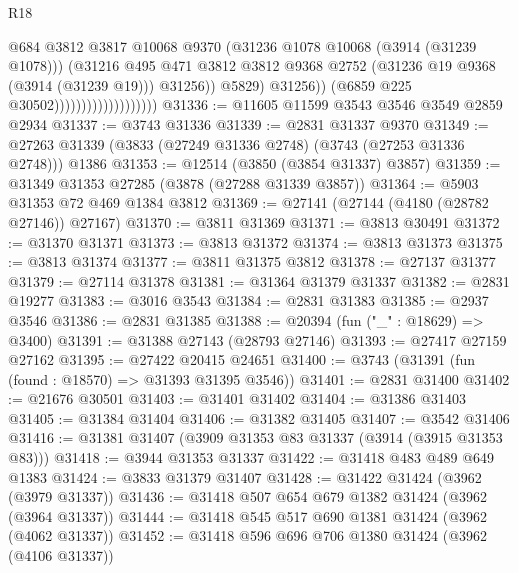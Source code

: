 \begin{lexlean}{R18}
\begin{coremodule}
                                                @684
                                                @3812
                                                @3817
                                                @10068
                                                @9370
                                                (@31236 @1078 @10068 (@3914 (@31239 @1078)))
                                                (@31216
                                                  @495
                                                  @471
                                                  @3812
                                                  @3812
                                                  @9368
                                                  @2752
                                                  (@31236 @19 @9368 (@3914 (@31239 @19)))
                                                  @31256))
                                              @5829)
                                            @31256))
                                        (@6859 @225 @30502)))))))))))))))))))
@31336 := @11605 @11599 @3543 @3546 @3549 @2859 @2934
@31337 := @3743 @31336
@31339 := @2831 @31337 @9370
@31349 := @27263 @31339 (@3833 (@27249 @31336 @2748) (@3743 (@27253 @31336 @2748))) @1386
@31353 := @12514 (@3850 (@3854 @31337) @3857)
@31359 := @31349 @31353 @27285 (@3878 (@27288 @31339 @3857))
@31364 := @5903 @31353 @72 @469 @1384 @3812
@31369 := @27141 (@27144 (@4180 (@28782 @27146)) @27167)
@31370 := @3811 @31369
@31371 := @3813 @30491
@31372 := @31370 @31371
@31373 := @3813 @31372
@31374 := @3813 @31373
@31375 := @3813 @31374
@31377 := @3811 @31375 @3812
@31378 := @27137 @31377
@31379 := @27114 @31378
@31381 := @31364 @31379 @31337
@31382 := @2831 @19277
@31383 := @3016 @3543
@31384 := @2831 @31383
@31385 := @2937 @3546
@31386 := @2831 @31385
@31388 := @20394 (fun ("_" : @18629) => @3400)
@31391 := @31388 @27143 (@28793 @27146)
@31393 := @27417 @27159 @27162
@31395 := @27422 @20415 @24651
@31400 := @3743 (@31391 (fun (found : @18570) => @31393 @31395 @3546))
@31401 := @2831 @31400
@31402 := @21676 @30501
@31403 := @31401 @31402
@31404 := @31386 @31403
@31405 := @31384 @31404
@31406 := @31382 @31405
@31407 := @3542 @31406
@31416 := @31381 @31407 (@3909 @31353 @83 @31337 (@3914 (@3915 @31353 @83)))
@31418 := @3944 @31353 @31337
@31422 := @31418 @483 @489 @649 @1383
@31424 := @3833 @31379 @31407
@31428 := @31422 @31424 (@3962 (@3979 @31337))
@31436 := @31418 @507 @654 @679 @1382 @31424 (@3962 (@3964 @31337))
@31444 := @31418 @545 @517 @690 @1381 @31424 (@3962 (@4062 @31337))
@31452 := @31418 @596 @696 @706 @1380 @31424 (@3962 (@4106 @31337))

\end{coremodule}
\end{lexlean}
